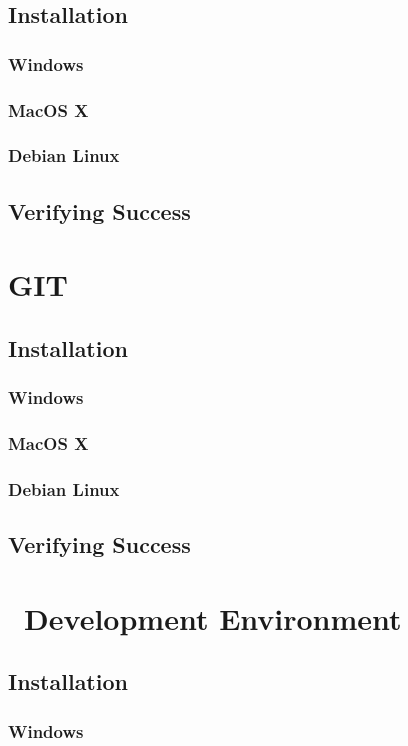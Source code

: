 \subsection{Installation}
\subsubsection{Windows}
\subsubsection{MacOS X}
\subsubsection{Debian Linux}
\subsection{Verifying Success}

\section{GIT}

\subsection{Installation}
\subsubsection{Windows}
\subsubsection{MacOS X}
\subsubsection{Debian Linux}
\subsection{Verifying Success}

\section{\csharp\ Development Environment}

\subsection{Installation}
\subsubsection{Windows}
